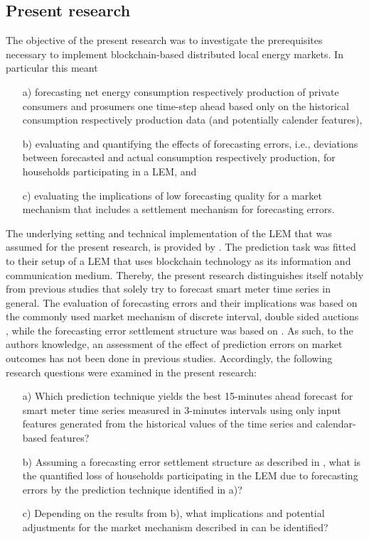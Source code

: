 \subsection{Present research}\label{Sec:Intro;Subsec:Present}

The objective of the present research was to investigate the prerequisites necessary to implement blockchain-based distributed local energy markets. In particular this meant
\begin{itemize}
    \item[a)] forecasting net energy consumption respectively production of private consumers and prosumers one time-step ahead based only on the historical consumption respectively production data (and potentially calender features),
    \item[b)] evaluating and quantifying the effects of forecasting errors, i.e., deviations between forecasted and actual consumption respectively production, for households participating in a LEM, and
    \item[c)] evaluating the implications of low forecasting quality for a market mechanism that includes a settlement mechanism for forecasting errors.
\end{itemize}

The underlying setting and technical implementation of the LEM that was assumed for the present research, is provided by \citet{Mengelkamp:2018a}. The prediction task was fitted to their setup of a LEM that uses blockchain technology as its information and communication medium. Thereby, the present research distinguishes itself notably from previous studies that solely try to forecast smart meter time series in general. The evaluation of forecasting errors and their implications was based on the commonly used market mechanism of discrete interval, double sided auctions \citep[e.g.,][]{Block:2008, Buchmann:2013}, while the forecasting error settlement structure was based on \citep{Mengelkamp:2018a}. As such, to the authors knowledge, an assessment of the effect of prediction errors on market outcomes has not been done in previous studies. Accordingly, the following research questions were examined in the present research:
\begin{itemize}
    \item[a)] Which prediction technique yields the best 15-minutes ahead forecast  for smart meter time series measured in 3-minutes intervals using only input features generated from the historical values of the time series and calendar-based features?
    \item[b)] Assuming a forecasting error settlement structure as described in \citet{Mengelkamp:2018a}, what is the quantified loss of households participating in the LEM due to forecasting errors by the prediction technique identified in a)?
    \item[c)] Depending on the results from b), what implications and potential adjustments for the market mechanism described in \citet{Mengelkamp:2018a} can be identified?
\end{itemize}

